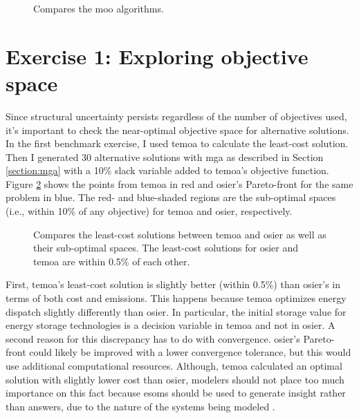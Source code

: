 \begin{figure}[ht]
  \centering
  \resizebox{0.75\columnwidth}{!}{}
  \caption{Compares the \ac{moo} algorithms.}
  \label{fig:algorithm-comparison}
\end{figure}



\section{Exercise 1: Exploring objective space}
Since structural uncertainty persists regardless of the number of objectives
used, it's important to check the near-optimal objective space for alternative
solutions. In the first benchmark exercise, I used \ac{temoa} to calculate the
least-cost solution. Then I generated 30 alternative solutions with \ac{mga} as
described in Section \ref{section:mga} with a 10\% slack variable added to
\ac{temoa}'s objective function. Figure \ref{fig:temoa-benchmark-01} shows the
points from \ac{temoa} in red and \ac{osier}'s Pareto-front for the same problem
in blue. The red- and blue-shaded regions are the sub-optimal spaces (i.e.,
within 10\% of any objective) for \ac{temoa} and \ac{osier}, respectively.

\begin{figure}[h]
  \centering
  \resizebox{0.6\columnwidth}{!}{}
  \caption{Compares the least-cost solutions between \acs{temoa}
  and \acs{osier} as well as their sub-optimal spaces. The least-cost solutions
  for \ac{osier} and \ac{temoa} are within 0.5\% of each other.}
  \label{fig:temoa-benchmark-01}
\end{figure}

First, \ac{temoa}'s least-cost solution is slightly better (within 0.5\%) than
\ac{osier}'s in terms of both cost and emissions. This happens because
\ac{temoa} optimizes energy dispatch slightly differently than \ac{osier}. In
particular, the initial storage value for energy storage technologies is a
decision variable in \ac{temoa} and not in \ac{osier}. A second reason for this
discrepancy has to do with convergence. \ac{osier}'s Pareto-front could likely
be improved with a lower convergence tolerance, but this would use additional
computational resources. Although, \ac{temoa} calculated an optimal solution
with slightly lower cost than \ac{osier}, modelers should not place too much
importance on this fact because \acp{esom} should be used to generate insight
rather than answers, due to the nature of the systems being modeled
\cite{decarolis_using_2011}.

